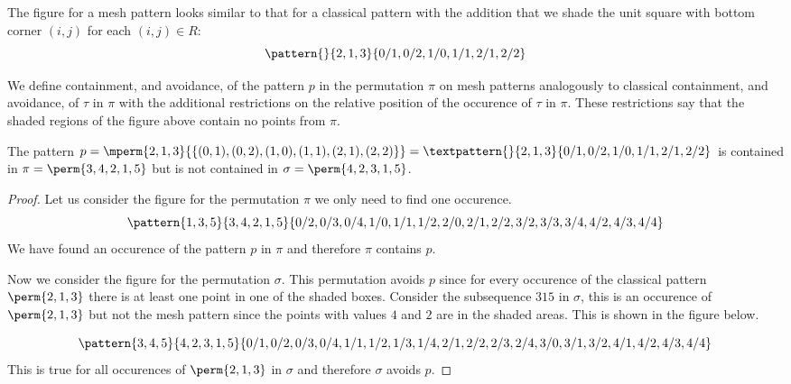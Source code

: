 The figure for a mesh pattern looks similar to that for a classical pattern with the
addition that we shade the unit square with bottom corner \((i,j)\) for each \((i,j) \in R\):
\begin{equation*}
    \pattern{}{ 2, 1, 3 }{ 0/1, 0/2, 1/0, 1/1, 2/1, 2/2 }
\end{equation*}

We define containment, and avoidance, of the pattern \(p\) in the permutation
\(\pi\) on mesh patterns analogously to classical containment, and avoidance,
of \(\tau\) in \(\pi\) with the additional restrictions on the relative
position of the occurence of \(\tau\) in \(\pi\). These restrictions say that
the shaded regions of the figure above contain no points from \(\pi\).

\begin{example}
    The pattern \(p=\mperm{2,1,3}{\{(0,1),(0,2),(1,0),(1,1),(2,1),(2,2)\}}=
    \textpattern{}{ 2, 1, 3 }{ 0/1, 0/2, 1/0, 1/1, 2/1, 2/2 }\) is contained in
    \(\pi = \perm{3,4,2,1,5}\) but is not contained in \(\sigma = \perm{4,2,3,1,5}\).
\end{example}
\begin{proof}
    Let us consider the figure for the permutation \(\pi\) we only need to find one occurence.
    \begin{equation*}
        \pattern{1,3,5}{3,4,2,1,5}{0/2,0/3,0/4,
                                   1/0,1/1,1/2,
                                   2/0,2/1,2/2,
                                   3/2,3/3,3/4,
                                   4/2,4/3,4/4}
    \end{equation*}
    We have found an occurence of the pattern \(p\) in \(\pi\) and therefore
    \(\pi\) contains \(p\).

    Now we consider the figure for the permutation \(\sigma\). This permutation
    avoids \(p\) since for every occurence of the classical pattern \(\perm{2,1,3}\)
    there is at least one point in one of the shaded boxes. Consider the subsequence
    \(315\) in \(\sigma\), this is an occurence of \(\perm{2,1,3}\) but not the mesh
    pattern since the points with values \(4\) and \(2\) are in the shaded areas.
    This is shown in the figure below.

    \begin{equation*}
        \pattern{3,4,5}{4,2,3,1,5}{0/1,0/2,0/3,0/4,
                                   1/1,1/2,1/3,1/4,
                                   2/1,2/2,2/3,2/4,
                                   3/0,3/1,3/2,
                                   4/1,4/2,4/3,4/4}
    \end{equation*}
    This is true for all occurences of \(\perm{2,1,3}\) in \(\sigma\) and
    therefore \(\sigma\) avoids \(p\).
\end{proof}

